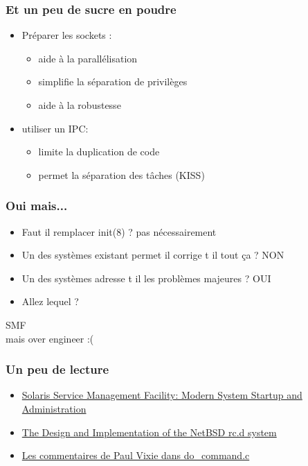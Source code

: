 \begin{frame}
	\frametitle{Et un peu de sucre en poudre}
	\begin{itemize}
			\pause
		\item Préparer les sockets :
			\begin{itemize}
				\item aide à la parallélisation
				\item simplifie la séparation de privilèges
				\item aide à la robustesse
			\end{itemize}
			\pause
		\item utiliser un IPC:
			\begin{itemize}
				\item limite la duplication de code
				\item permet la séparation des tâches (KISS)
			\end{itemize}
	\end{itemize}
\end{frame}

\begin{frame}
	\frametitle{Oui mais...}
	\begin{itemize}
			\pause
		\item Faut il remplacer init(8) ? \pause pas nécessairement
			\pause
		\item Un des systèmes existant permet il corrige t il tout ça ? \pause NON
			\pause
		\item Un des systèmes adresse t il les problèmes majeures ? \pause OUI
			\pause
		\item Allez lequel ?\pause
	\end{itemize}
	\center
	\huge SMF \\
	\pause
	\normalsize
	mais over engineer :(
\end{frame}

\begin{frame}
	\frametitle{Un peu de lecture}
	\begin{itemize}
		\item \href{https://www.usenix.org/legacy/event/lisa05/tech/full_papers/adams/adams.pdf}{Solaris Service Management Facility: Modern System Startup and Administration}
		\item \href{https://www.usenix.org/legacy/event/usenix01/freenix01/full_papers/mewburn/mewburn_html/}{The Design and Implementation of the NetBSD rc.d system}
		\item \href{https://svnweb.freebsd.org/base/head/usr.sbin/cron/cron/do_command.c?view=markup}{Les commentaires de Paul Vixie dans do\_command.c}
	\end{itemize}
\end{frame}

